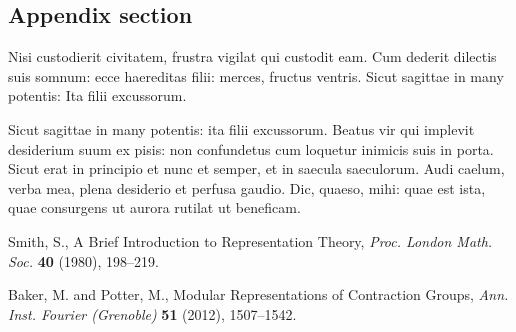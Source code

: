 \documentclass{arkiv}
\begin{document}
\begin{appendix}

\section{Appendix section}

Nisi custodierit civitatem,
frustra vigilat qui custodit eam. Cum dederit dilectis suis somnum:
ecce haereditas filii: merces, fructus ventris. Sicut sagittae in
many potentis: Ita filii excussorum.

Sicut sagittae in many potentis: ita filii excussorum. Beatus vir qui
implevit desiderium suum ex pisis: non confundetus cum loquetur inimicis
suis in porta.  Sicut erat in principio et nunc et semper, et in saecula
saeculorum. Audi caelum, verba mea, plena desiderio et perfusa gaudio.
Dic, quaeso, mihi: quae est ista, quae consurgens ut aurora rutilat ut
beneficam.
\end{appendix}




\alphanumeral %
%
\begin{thebibliography}{}

Smith, S.,  A Brief Introduction to Representation Theory,
\textit{Proc. London Math. Soc.} \textbf{40} (1980), 198--219.
\endbibitem

Baker, M. and Potter, M., Modular Representations of Contraction Groups, \textit{Ann. Inst. Fourier
(Grenoble)} \textbf{51} (2012), 1507--1542.
\endbibitem


\end{thebibliography}
\end{document}
